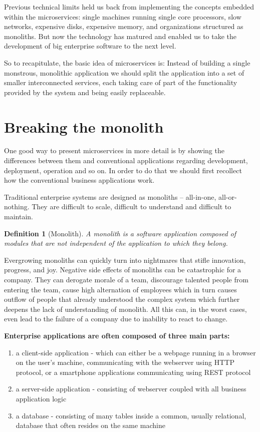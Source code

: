 \documentclass[12pt,oneside]{fithesis2}
\newtheorem{definition}{Definition}
\begin{document}
Previous technical limits held us back from implementing the concepts embedded within the microservices: single machines running single core processors, slow networks, expensive disks, expensive memory, and organizations structured as monoliths. But now the technology has matured and enabled us to take the development of big enterprise software to the next level.

So to recapitulate, the basic idea of microservices is: Instead of building a single monstrous, monolithic application we should split the application into a set of smaller interconnected services, each taking care of part of the functionality provided by the system and being easily replaceable.

\section{Breaking the monolith}

One good way to present microservices in more detail is by showing the differences between them and conventional applications regarding development, deployment, operation and so on. In order to do that we should first recollect how the conventional business applications work.

Traditional enterprise systems are designed as monoliths -- all-in-one, all-or-nothing. They are difficult to scale, difficult to understand and difficult to maintain.

\begin{definition}[Monolith]
A monolith is a software application composed of modules that are not independent of the application to which they belong. \cite{mytat} 
\end{definition}

Evergrowing monoliths can quickly turn into nightmares that stifle innovation, progress, and joy. Negative side effects of monoliths can be catastrophic for a company. They can derogate morale of a team, discourage talented people from entering the team, cause high alternation of employees which in turn causes outflow of people that already understood the complex system which further deepens the lack of understanding of monolith. All this can, in the worst cases, even lead to the failure of a company due to inability to react to change. \cite{rma}
\bigskip

\noindent\textbf{Enterprise applications are often composed of three main parts:}

\begin{enumerate}
   \item a client-side application - which can either be a webpage running in a  browser on the user's machine, communicating with the webserver using HTTP  protocol, or a smartphone applications communicating using REST protocol
   \item a server-side application - consisting of webserver coupled with all business application logic
   \item a database - consisting of many tables inside a common, usually relational, database that often resides on the same machine
\end{enumerate}
\end{document}
